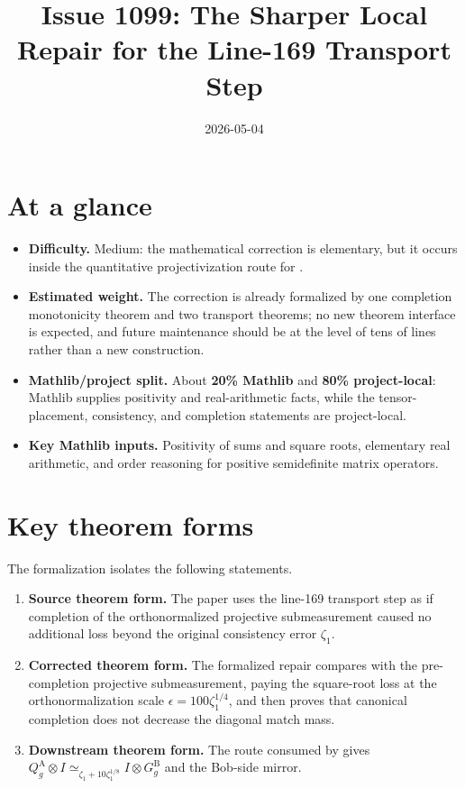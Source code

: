 \documentclass[11pt]{article}
\title{Issue 1099: The Sharper Local Repair for the Line-169 Transport Step}
\author{}
\date{2026-05-04}
\begin{document}
\maketitle

\section{At a glance}

\begin{itemize}
  \item \textbf{Difficulty.} Medium: the mathematical correction is elementary,
  but it occurs inside the quantitative projectivization route for
  .
  \item \textbf{Estimated weight.} The correction is already formalized by one
  completion monotonicity theorem and two transport theorems; no new theorem
  interface is expected, and future maintenance should be at the level of tens
  of lines rather than a new construction.
  \item \textbf{Mathlib/project split.} About \textbf{20\% Mathlib} and
  \textbf{80\% project-local}: Mathlib supplies positivity and real-arithmetic
  facts, while the tensor-placement, consistency, and completion statements are
  project-local.
  \item \textbf{Key Mathlib inputs.} Positivity of sums and square roots,
  elementary real arithmetic, and order reasoning for positive semidefinite
  matrix operators.
\end{itemize}

\section{Key theorem forms}

The formalization isolates the following statements.
\begin{enumerate}
  \item \textbf{Source theorem form.}  The paper uses the line-169 transport
  step as if completion of the orthonormalized projective submeasurement caused
  no additional loss beyond the original consistency error $\zeta_1$.
  \item \textbf{Corrected theorem form.}  The formalized repair compares with
  the pre-completion projective submeasurement, paying the square-root loss at
  the orthonormalization scale
  $\epsilon = 100\zeta_1^{1/4}$, and then proves that canonical completion does
  not decrease the diagonal match mass.
  \item \textbf{Downstream theorem form.}  The route consumed by
   gives
  \(Q^{\mathrm A}_g \otimes I
    \simeq_{\zeta_1 + 10\zeta_1^{1/8}} I \otimes G^{\mathrm B}_g\)
  and the Bob-side mirror.
\end{enumerate}
\end{document}
